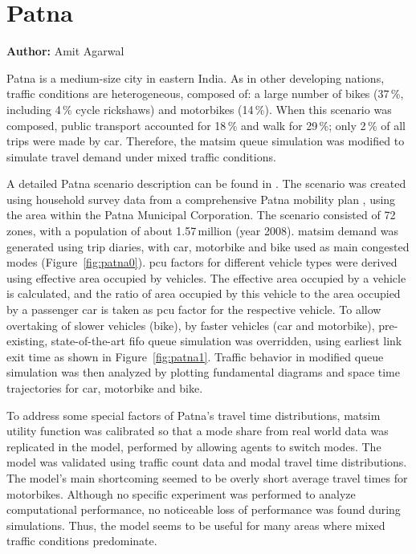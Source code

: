 \section{Patna}
\label{sec:patna}
\hfill \textbf{Author:} Amit Agarwal


Patna is a medium-size city in eastern India. As in other developing nations, traffic conditions are heterogeneous, composed of: a large number of bikes (37\,\%, including 4\,\% cycle rickshaws) and motorbikes (14\,\%). When this scenario was composed, public transport accounted for 18\,\% and walk for 29\,\%; only 2\,\% of all trips were made by car. Therefore, the \gls{matsim} queue simulation was modified to simulate travel demand under mixed traffic conditions.

A detailed Patna scenario description can be found in \citet[][]{AgarwalEtcMixedTraffic}. The scenario was created using household survey data from a comprehensive Patna mobility plan \citep[][]{TrippItransVks2009PatnaReport}, using the area within the Patna Municipal Corporation. The scenario consisted of 72\,zones, with a population of about 1.57\,million (year 2008). \gls{matsim} demand was generated using trip diaries, with car, motorbike and bike used as main congested modes (Figure~\ref{fig:patna0}). \gls{pcu} factors for different vehicle types were derived using effective area occupied by vehicles. The effective area occupied by a vehicle is calculated, and the ratio of area occupied by this vehicle to the area occupied by a passenger car is taken as \gls{pcu} factor for the respective vehicle.
To allow overtaking of slower vehicles (bike), by faster vehicles (car and motorbike), pre-existing, state-of-the-art \gls{fifo} queue simulation was overridden, using earliest link exit time as shown in Figure~\ref{fig:patna1}. Traffic behavior in modified queue simulation was then analyzed by plotting fundamental diagrams and space time trajectories for car, motorbike and bike.

To address some special factors of Patna's travel time distributions, \gls{matsim} utility function was calibrated so that a mode share from real world data was replicated in the model, performed by allowing agents to switch modes. The model was validated using traffic count data and modal travel time distributions. The model's main shortcoming seemed to be overly short average travel times for motorbikes. Although no specific experiment was performed to analyze computational performance, no noticeable loss of performance was found during simulations. Thus, the model seems to be useful for many areas where mixed traffic conditions predominate.

